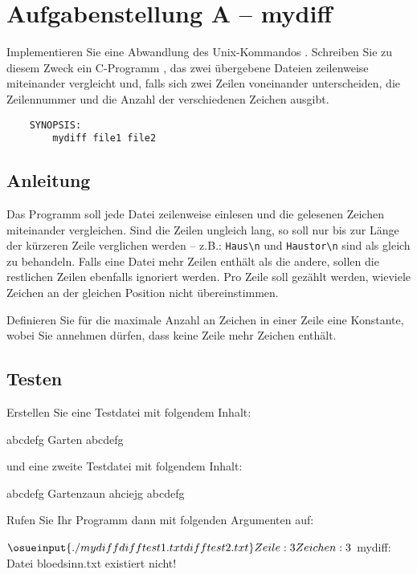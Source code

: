 




\section*{Aufgabenstellung A -- mydiff}
Implementieren Sie eine Abwandlung des Unix-Kommandos .
Schreiben Sie zu diesem Zweck ein C-Programm
, das zwei übergebene Dateien zeilenweise
miteinander vergleicht und, falls sich zwei Zeilen voneinander
unterscheiden, die Zeilennummer und die Anzahl der
verschiedenen Zeichen ausgibt.

\begin{verbatim}
    SYNOPSIS:
        mydiff file1 file2
\end{verbatim}

\subsection*{Anleitung}
      Das Programm soll jede Datei zeilenweise einlesen und die
      gelesenen Zeichen miteinander vergleichen. Sind die Zeilen
      ungleich lang, so soll nur bis zur Länge der kürzeren Zeile
      verglichen werden -- z.B.: \verb+Haus\n+ und \verb+Haustor\n+
      sind als gleich zu behandeln. Falls eine Datei mehr Zeilen enthält
      als die andere, sollen die restlichen Zeilen ebenfalls ignoriert
      werden. Pro Zeile soll gezählt werden, wieviele Zeichen an der
      gleichen Position nicht übereinstimmen.

      Definieren Sie für die maximale Anzahl an Zeichen in einer
      Zeile eine Konstante, wobei Sie annehmen dürfen, dass keine
      Zeile mehr Zeichen enthält.

\subsection*{Testen}

Erstellen Sie eine Testdatei  mit folgendem Inhalt:

\begin{osuefmtcode}
      abcdefg
      Garten
      abcdefg
\end{osuefmtcode}

und eine zweite Testdatei  mit folgendem Inhalt:

\begin{osuefmtcode}
      abcdefg
      Gartenzaun
      ahciejg
      abcdefg
\end{osuefmtcode}

Rufen Sie Ihr Programm dann mit folgenden Argumenten auf:

\begin{osuefmtcode}
    $ \osueinput{./mydiff difftest1.txt difftest2.txt}
    Zeile: 3 Zeichen: 3
    $ 
    mydiff: Datei bloedsinn.txt existiert nicht!
\end{osuefmtcode}

\osueguidelinesone


